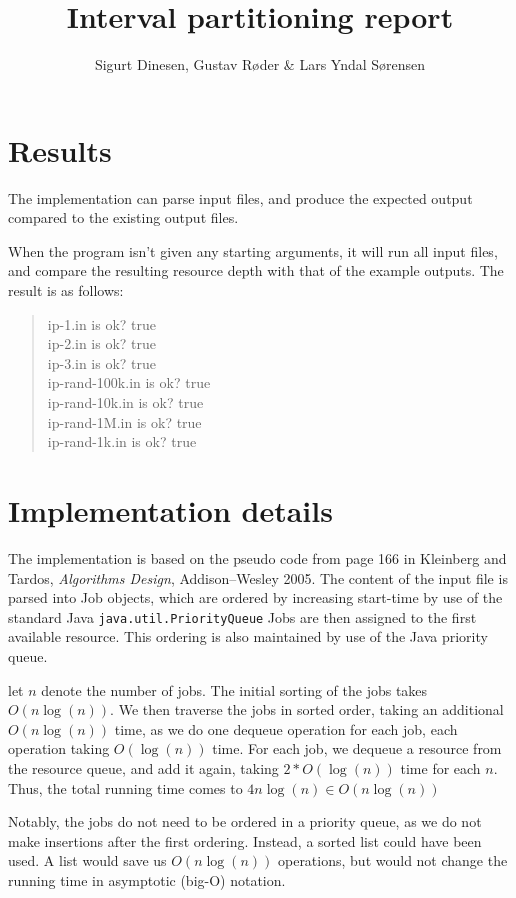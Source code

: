 \documentclass{tufte-handout}
\title{Interval partitioning report}
\author{Sigurt Dinesen, Gustav Røder \& Lars Yndal Sørensen}
\begin{document}
  \maketitle

  \section{Results}
  The implementation can parse input files, and produce the expected output
  compared to the existing output files.

  When the program isn't given any starting arguments, it will run all input
  files, and compare the resulting resource depth with that of the example
  outputs. The result is as follows:

  \begin{quotation}
 
	ip-1.in is ok? true\\
	ip-2.in is ok? true\\
	ip-3.in is ok? true\\
	ip-rand-100k.in is ok? true\\
	ip-rand-10k.in is ok? true\\
	ip-rand-1M.in is ok? true\\
	ip-rand-1k.in is ok? true\\

  \end{quotation}

  \section{Implementation details}
	The implementation is based on the pseudo code from page 166 in Kleinberg and Tardos, \emph{Algorithms Design}, Addison--Wesley 2005.%
	The content of the input file is parsed into Job objects, which are
	ordered by increasing start-time by use of the standard Java
	\texttt{java.util.PriorityQueue}
	Jobs are then assigned to the first available resource. This ordering is
	also maintained by use of the Java priority queue.

	let $n$ denote the number of jobs.
	The initial sorting of the jobs takes $O(n \log(n))$. We then traverse
	the jobs in sorted order, taking an additional $O(n \log(n))$ time, as
	we do one dequeue operation for each job, each operation taking
	$O(\log(n))$ time.
	For each job, we dequeue a resource from the resource queue, and add it
	again, taking $2 * O(\log(n))$ time for each $n$.
	Thus, the total running time comes to $4n \log(n) \in O(n \log(n))$

	Notably, the jobs do not need to be ordered in a priority queue, as we
	do not make insertions after the first ordering. Instead, a sorted list
	could have been used. A list would save us $O(n \log(n))$ operations,
	but would not change the running time in asymptotic (big-O) notation.
\end{document}
